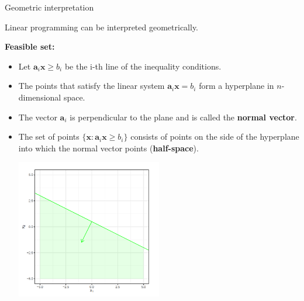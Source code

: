 \begin{vbframe}{Geometric interpretation}

Linear programming can be interpreted geometrically.

\lz

\textbf{Feasible set:}
\begin{itemize}
\item Let $\bm{a}_i \bm{x} \ge b_i$ be the i-th line of the inequality conditions.
\item The points that satisfy the linear system $\bm{a}_i \bm{x} = b_i$ form a hyperplane in $n$-dimensional space.
\item The vector $\bm{a}_i$ is perpendicular to the plane and is called the \textbf{normal vector}.
\framebreak
\item The set of points $\{\bm{x}: \bm{a}_i \bm{x} \ge b_i\}$ consists of points on the side of the hyperplane into which the normal vector points (\textbf{half-space}).

\vspace{0.2cm}
\begin{center}
\includegraphics[width = 0.5\textwidth]{figure_man/geo-interpretation.png}
\end{center}






\end{itemize}
\end{vbframe}
